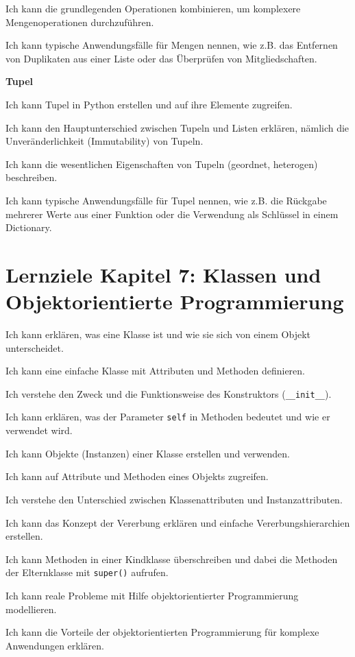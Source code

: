 \begin{todolist}
\begin{todolist}
        \item Ich kann die grundlegenden Operationen kombinieren, um komplexere Mengenoperationen durchzuführen.
        \item Ich kann typische Anwendungsfälle für Mengen nennen, wie z.B. das Entfernen von Duplikaten aus einer Liste oder das Überprüfen von Mitgliedschaften.
    \end{todolist}
    \item \textbf{Tupel}
    \begin{todolist}
        \item Ich kann Tupel in Python erstellen und auf ihre Elemente zugreifen.
        \item Ich kann den Hauptunterschied zwischen Tupeln und Listen erklären, nämlich die Unveränderlichkeit (Immutability) von Tupeln.
        \item Ich kann die wesentlichen Eigenschaften von Tupeln (geordnet, heterogen) beschreiben.
        \item Ich kann typische Anwendungsfälle für Tupel nennen, wie z.B. die Rückgabe mehrerer Werte aus einer Funktion oder die Verwendung als Schlüssel in einem Dictionary.
    \end{todolist}
\end{todolist}

\section*{Lernziele Kapitel 7: Klassen und Objektorientierte Programmierung}
\begin{todolist}
    \item Ich kann erklären, was eine Klasse ist und wie sie sich von einem Objekt unterscheidet.
    \item Ich kann eine einfache Klasse mit Attributen und Methoden definieren.
    \item Ich verstehe den Zweck und die Funktionsweise des Konstruktors (\lstinline|__init__|).
    \item Ich kann erklären, was der Parameter \lstinline|self| in Methoden bedeutet und wie er verwendet wird.
    \item Ich kann Objekte (Instanzen) einer Klasse erstellen und verwenden.
    \item Ich kann auf Attribute und Methoden eines Objekts zugreifen.
    \item Ich verstehe den Unterschied zwischen Klassenattributen und Instanzattributen.
    \item Ich kann das Konzept der Vererbung erklären und einfache Vererbungshierarchien erstellen.
    \item Ich kann Methoden in einer Kindklasse überschreiben und dabei die Methoden der Elternklasse mit \lstinline|super()| aufrufen.
    \item Ich kann reale Probleme mit Hilfe objektorientierter Programmierung modellieren.
    \item Ich kann die Vorteile der objektorientierten Programmierung für komplexe Anwendungen erklären.
\end{todolist}